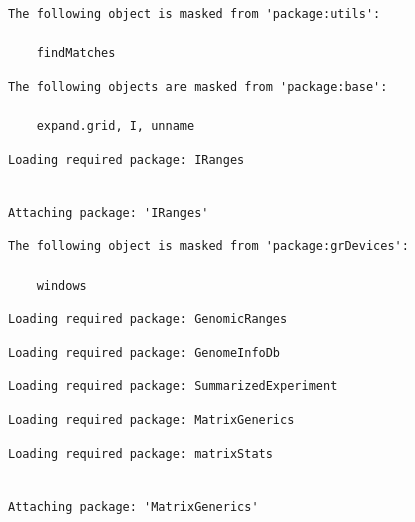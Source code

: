 \documentclass[
  letterpaper,
  DIV=11,
  numbers=noendperiod]{scrartcl}
\begin{document}
\begin{verbatim}
The following object is masked from 'package:utils':

    findMatches
\end{verbatim}

\begin{verbatim}
The following objects are masked from 'package:base':

    expand.grid, I, unname
\end{verbatim}

\begin{verbatim}
Loading required package: IRanges
\end{verbatim}

\begin{verbatim}

Attaching package: 'IRanges'
\end{verbatim}

\begin{verbatim}
The following object is masked from 'package:grDevices':

    windows
\end{verbatim}

\begin{verbatim}
Loading required package: GenomicRanges
\end{verbatim}

\begin{verbatim}
Loading required package: GenomeInfoDb
\end{verbatim}

\begin{verbatim}
Loading required package: SummarizedExperiment
\end{verbatim}

\begin{verbatim}
Loading required package: MatrixGenerics
\end{verbatim}

\begin{verbatim}
Loading required package: matrixStats
\end{verbatim}

\begin{verbatim}

Attaching package: 'MatrixGenerics'
\end{verbatim}
\end{document}
